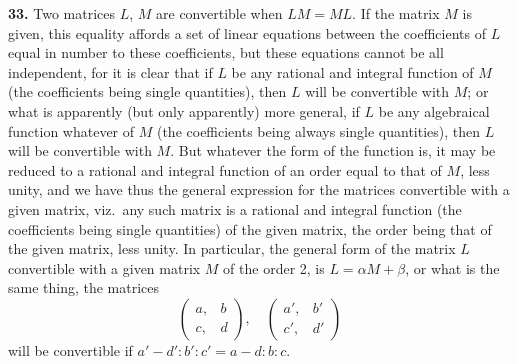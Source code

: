 \documentclass[12pt,a4paper]{article}
\theoremstyle{definition}
\begin{document}
\newpage

\medskip
\noindent\textbf{33.} Two matrices $L$, $M$ are convertible when $LM = ML$. If the matrix $M$ is given, this equality affords a set of linear equations between the coefficients of $L$ equal in number to these coefficients, but these equations cannot be all independent, for it is clear that if $L$ be any rational and integral function of $M$ (the coefficients being single quantities), then $L$ will be convertible with $M$; or what is apparently (but only apparently) more general, if $L$ be any algebraical function whatever of $M$ (the coefficients being always single quantities), then $L$ will be convertible with $M$. But whatever the form of the function is, it may be reduced to a rational and integral function of an order equal to that of $M$, less unity, and we have thus the general expression for the matrices convertible with a given matrix, viz.\ any such matrix is a rational and integral function (the coefficients being single quantities) of the given matrix, the order being that of the given matrix, less unity. In particular, the general form of the matrix $L$ convertible with a given matrix $M$ of the order 2, is $L = \alpha M + \beta$, or what is the same thing, the matrices
\[
\begin{pmatrix} a, & b \\ c, & d \end{pmatrix},\quad
\begin{pmatrix} a', & b' \\ c', & d' \end{pmatrix}
\]
will be convertible if $a'-d' : b' : c' = a-d : b : c$.
\end{document}
